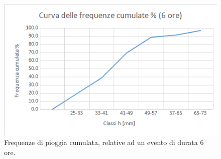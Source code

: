 \begin{figure}[H]\centering
        \includegraphics[scale=.6]{immagini/freq_piogg_cum_6ore.png}
        \caption{Frequenze di pioggia cumulata, relative ad un evento di durata 6 ore.}
      \label{freq_cum_piogg_05ore}
\end{figure}    

